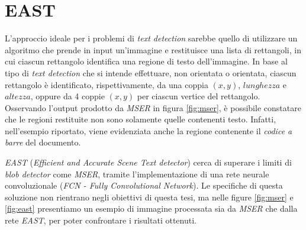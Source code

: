 \section{EAST}
L'approccio ideale per i problemi di \textit{text detection} sarebbe quello di utilizzare un algoritmo che prende in input un'immagine e restituisce una lista di rettangoli, in cui ciascun rettangolo identifica una regione di testo dell'immagine. In base al tipo di \textit{text detection} che si intende effettuare, non orientata o orientata, ciascun rettangolo \`e identificato, rispettivamente, da una coppia $(x, y)$, $lunghezza$ e $altezza$, oppure da 4 coppie $(x, y)$ per ciascun vertice del rettangolo. Osservando l'output prodotto da \textit{MSER} in figura \ref{fig:mser}, \`e possibile constatare che le regioni restituite non sono solamente quelle contenenti testo. Infatti, nell'esempio riportato, viene evidenziata anche la regione contenente il \textit{codice a barre} del documento.\par 
\textit{EAST} (\textit{Efficient and Accurate Scene Text detector}) \cite{bib:east} cerca di superare i limiti di \textit{blob detector} come \textit{MSER}, tramite l'implementazione di una rete neurale convoluzionale (\textit{FCN - Fully Convolutional Network}). Le specifiche di questa soluzione non rientrano negli obiettivi di questa tesi, ma nelle figure \ref{fig:mser} e \ref{fig:east} presentiamo un esempio di immagine processata sia da \textit{MSER} che dalla rete \textit{EAST}, per poter confrontare i risultati ottenuti.
